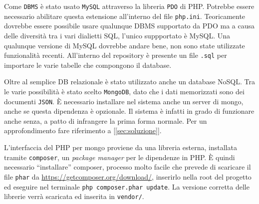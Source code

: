 Come \texttt{DBMS} è stato usato \texttt{MySQL} attraverso la libreria \texttt{PDO} di PHP. Potrebbe essere necessario abilitare questa estensione all'interno del file \texttt{php.ini}. Teoricamente dovrebbe essere possibile usare qualunque DBMS supportato da PDO ma a causa delle diversità tra i vari dialietti SQL, l'unico suppportato è MySQL. Una qualunque versione di MySQL dovrebbe andare bene, non sono state utilizzate funzionalità recenti. All'interno del repository è presente un file \texttt{.sql} per importare le varie tabelle che compongono il database.

Oltre al semplice DB relazionale è stato utilizzato anche un database NoSQL. Tra le varie possibilità è stato scelto \texttt{MongoDB}, dato che i dati memorizzati sono dei documenti \texttt{JSON}. È necessario installare nel sistema anche un server di mongo, anche se questa dipendenza è opzionale. Il sistema è infatti in grado di funzionare anche senza, a patto di infrangere la prima forma normale. Per un approfondimento fare riferimento a [\ref{sec:soluzione}]. 

L'interfaccia del PHP per mongo proviene da una libreria esterna, installata tramite \texttt{composer}, un \emph{package manager} per le dipendenze in PHP. È quindi necessario ``installare'' composer, processo molto facile che prevede di scaricare il file \texttt{phar} da \url{https://getcomposer.org/download/}, inserirlo nella root del progetto ed eseguire nel terminale \texttt{php composer.phar update}. La versione corretta delle librerie verrà scaricata ed inserita in \texttt{vendor/}.
